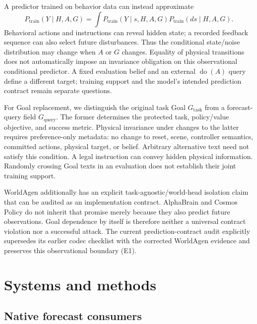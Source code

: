 \documentclass[11pt]{article}
\newcommand{\doop}{\operatorname{do}}
\begin{document}
A predictor trained on behavior data can instead approximate
\begin{equation}
 P_{\mathrm{train}}(Y\mid H,A,G)
 = \int P_{\mathrm{train}}(Y\mid s,H,A,G)
          P_{\mathrm{train}}(ds\mid H,A,G).
\end{equation}
Behavioral actions and instructions can reveal hidden state; a recorded
feedback sequence can also select future disturbances. Thus the conditional
state/noise distribution may change when $A$ or $G$ changes. Equality of
physical transitions does not automatically impose an invariance obligation
on this observational conditional predictor. A fixed evaluation belief and an
external $\doop(A)$ query define a different target; training support and the
model's intended prediction contract remain separate questions.

For Goal replacement, we distinguish the original task Goal $G_{\mathrm{task}}$
from a forecast-query field $G_{\mathrm{query}}$. The former determines the
protected task, policy/value objective, and success metric. Physical invariance
under changes to the latter requires preference-only metadata: no change to
reset, scene, controller semantics, committed actions, physical target, or
belief. Arbitrary alternative text need not satisfy this condition. A legal
instruction can convey hidden physical information. Randomly crossing Goal
texts in an evaluation does not establish their joint training support.

WorldAgen additionally has an explicit task-agnostic/world-head isolation
claim that can be audited as an implementation contract. AlphaBrain and
Cosmos Policy do not inherit that promise merely because they also predict
future observations. Goal dependence by itself is therefore neither a universal
contract violation nor a successful attack. The current prediction-contract
audit explicitly supersedes its earlier codec checklist with the corrected
WorldAgen evidence and preserves this observational boundary (E1).

\section{Systems and methods}

\subsection{Native forecast consumers}
\end{document}
